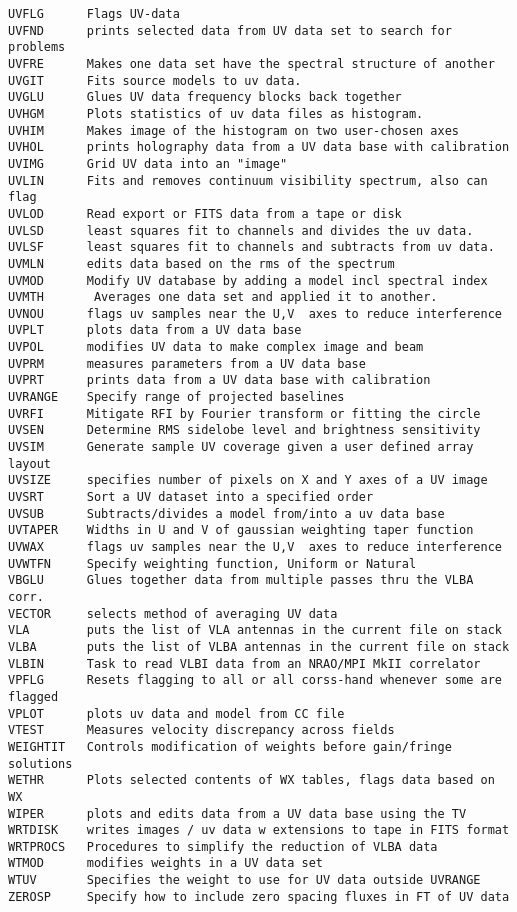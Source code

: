 \begin{verbatim}
UVFLG      Flags UV-data
UVFND      prints selected data from UV data set to search for problems
UVFRE      Makes one data set have the spectral structure of another
UVGIT      Fits source models to uv data.
UVGLU      Glues UV data frequency blocks back together
UVHGM      Plots statistics of uv data files as histogram.
UVHIM      Makes image of the histogram on two user-chosen axes
UVHOL      prints holography data from a UV data base with calibration
UVIMG      Grid UV data into an "image"
UVLIN      Fits and removes continuum visibility spectrum, also can flag
UVLOD      Read export or FITS data from a tape or disk
UVLSD      least squares fit to channels and divides the uv data.
UVLSF      least squares fit to channels and subtracts from uv data.
UVMLN      edits data based on the rms of the spectrum
UVMOD      Modify UV database by adding a model incl spectral index
UVMTH       Averages one data set and applied it to another.
UVNOU      flags uv samples near the U,V  axes to reduce interference
UVPLT      plots data from a UV data base
UVPOL      modifies UV data to make complex image and beam
UVPRM      measures parameters from a UV data base
UVPRT      prints data from a UV data base with calibration
UVRANGE    Specify range of projected baselines
UVRFI      Mitigate RFI by Fourier transform or fitting the circle
UVSEN      Determine RMS sidelobe level and brightness sensitivity
UVSIM      Generate sample UV coverage given a user defined array layout
UVSIZE     specifies number of pixels on X and Y axes of a UV image
UVSRT      Sort a UV dataset into a specified order
UVSUB      Subtracts/divides a model from/into a uv data base
UVTAPER    Widths in U and V of gaussian weighting taper function
UVWAX      flags uv samples near the U,V  axes to reduce interference
UVWTFN     Specify weighting function, Uniform or Natural
VBGLU      Glues together data from multiple passes thru the VLBA corr.
VECTOR     selects method of averaging UV data
VLA        puts the list of VLA antennas in the current file on stack
VLBA       puts the list of VLBA antennas in the current file on stack
VLBIN      Task to read VLBI data from an NRAO/MPI MkII correlator
VPFLG      Resets flagging to all or all corss-hand whenever some are flagged
VPLOT      plots uv data and model from CC file
VTEST      Measures velocity discrepancy across fields
WEIGHTIT   Controls modification of weights before gain/fringe solutions
WETHR      Plots selected contents of WX tables, flags data based on WX
WIPER      plots and edits data from a UV data base using the TV
WRTDISK    writes images / uv data w extensions to tape in FITS format
WRTPROCS   Procedures to simplify the reduction of VLBA data
WTMOD      modifies weights in a UV data set
WTUV       Specifies the weight to use for UV data outside UVRANGE
ZEROSP     Specify how to include zero spacing fluxes in FT of UV data
\end{verbatim}\eve

